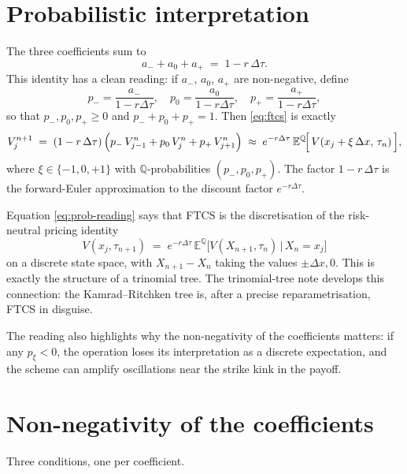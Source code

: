 \documentclass[11pt,a4paper]{article}
\begin{document}
\section{Probabilistic interpretation}

The three coefficients sum to
\[
a_- + a_0 + a_+ \;=\; 1 - r\,\Delta\tau.
\]
This identity has a clean reading: if $a_-$, $a_0$, $a_+$ are
non-negative, define
\[
p_-  = \frac{a_-}{1 - r\Delta\tau},\quad
p_0  = \frac{a_0}{1 - r\Delta\tau},\quad
p_+  = \frac{a_+}{1 - r\Delta\tau},
\]
so that $p_-, p_0, p_+ \ge 0$ and $p_- + p_0 + p_+ = 1$. Then
\eqref{eq:ftcs} is exactly
\begin{equation}
V_j^{n+1} \;=\; (1 - r\,\Delta\tau)\,
\Bigl(p_-\,V_{j-1}^n + p_0\,V_j^n + p_+\,V_{j+1}^n\Bigr)
\;\approx\; e^{-r\Delta\tau}\,
\mathbb{E}^{\mathbb{Q}}\!\Bigl[\,V(x_j + \xi\,\Delta x,\,\tau_n)\,\Bigr],
\label{eq:prob-reading}
\end{equation}
where $\xi \in \{-1, 0, +1\}$ with $\mathbb{Q}$-probabilities
$(p_-, p_0, p_+)$. The factor $1 - r\,\Delta\tau$ is the
forward-Euler approximation to the discount factor $e^{-r\Delta\tau}$.

Equation \eqref{eq:prob-reading} says that FTCS is the discretisation
of the risk-neutral pricing identity
\[
V(x_j, \tau_{n+1})
\;=\; e^{-r\Delta\tau}\,\mathbb{E}^{\mathbb{Q}}\!\bigl[V(X_{n+1}, \tau_n)\,
\big|\, X_n = x_j\bigr]
\]
on a discrete state space, with $X_{n+1} - X_n$ taking the values
$\pm\Delta x, 0$. This is exactly the structure of a trinomial tree.
The trinomial-tree note develops this connection: the Kamrad--Ritchken tree
is, after a precise reparametrisation, FTCS in disguise.

The reading also highlights why the non-negativity of the coefficients
matters: if any $p_\xi < 0$, the operation loses its interpretation as
a discrete expectation, and the scheme can amplify oscillations near
the strike kink in the payoff.

\section{Non-negativity of the coefficients}\label{sec:positivity}

Three conditions, one per coefficient.
\end{document}
